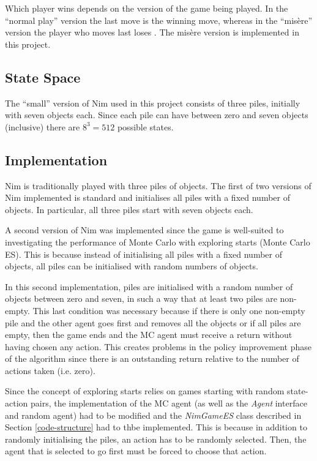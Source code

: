 \documentclass[11pt,a4paper,twoside,openright]{report}
\begin{document}
Which player wins depends on the version of the game being played. In the ``normal play'' version the last move is the winning move, whereas in the ``mis\`ere'' version the player who moves last loses \cite{winning-ways-math-plays}. The mis\`ere version is implemented in this project.


\subsection{State Space}

The ``small'' version of Nim used in this project  consists of three piles, initially with seven objects each. Since each pile can have between zero and seven objects (inclusive) there are $8^3 = 512$ possible states.


\subsection{Implementation}
\label{sec:NimImplementation}

Nim is traditionally played with three piles of objects. The first of two versions of Nim implemented is standard and initialises all piles with a fixed number of objects. In particular, all three piles start with seven objects each.

A second version of Nim was implemented since the game is well-suited to investigating the performance of Monte Carlo with exploring starts (Monte Carlo ES). This is because instead of initialising all piles with a fixed number of objects, all piles can be initialised with random numbers of objects.

In this second implementation, piles are initialised with a random number of objects between zero and seven, in such a way that at least two piles are non-empty. This last condition was necessary because if there is only one non-empty pile and the other agent goes first and removes all the objects or if all piles are empty, then the game ends and the MC agent must receive a return without having chosen any action. This creates problems in the policy improvement phase of the algorithm since there is an outstanding return relative to the number of actions taken (i.e. zero).

Since the concept of exploring starts relies on games starting with random state-action pairs, the implementation of the MC agent (as well as the \emph{Agent} interface and random agent) had to be modified and the \emph{NimGameES} class described in Section \ref{code-structure} had to thbe implemented. This is because in addition to randomly initialising the piles, an action has to be randomly selected. Then, the agent that is selected to go first must be forced to choose that action.
\end{document}
